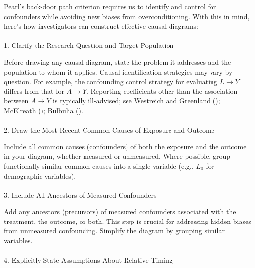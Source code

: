 \documentclass[
  singlecolumn]{article}
\makeatletter
\let\oldparagraph\paragraph
\renewcommand{\paragraph}{
    \@ifstar
      \xxxParagraphStar
      \xxxParagraphNoStar
  }
\newcommand{\xxxParagraphStar}[1]{\oldparagraph*{#1}\mbox{}}
\newcommand{\xxxParagraphNoStar}[1]{\oldparagraph{#1}\mbox{}}
\makeatother
\begin{document}
Pearl's back-door path criterion requires us to identify and control for
confounders while avoiding new biases from overconditioning. With this
in mind, here's how investigators can construct effective causal
diagrams:

\paragraph{1. Clarify the Research Question and Target
Population}\label{clarify-the-research-question-and-target-population}

Before drawing any causal diagram, state the problem it addresses and
the population to whom it applies. Causal identification strategies may
vary by question. For example, the confounding control strategy for
evaluating \(L \to Y\) differs from that for \(A \to Y\). Reporting
coefficients other than the association between \(A \to Y\) is typically
ill-advised; see Westreich and Greenland
(); McElreath
(); Bulbulia
().

\paragraph{2. Draw the Most Recent Common Causes of Exposure and
Outcome}\label{draw-the-most-recent-common-causes-of-exposure-and-outcome}

Include all common causes (confounders) of both the exposure and the
outcome in your diagram, whether measured or unmeasured. Where possible,
group functionally similar common causes into a single variable (e.g.,
\(L_0\) for demographic variables).

\paragraph{3. Include All Ancestors of Measured
Confounders}\label{include-all-ancestors-of-measured-confounders}

Add any ancestors (precursors) of measured confounders associated with
the treatment, the outcome, or both. This step is crucial for addressing
hidden biases from unmeasured confounding. Simplify the diagram by
grouping similar variables.

\paragraph{4. Explicitly State Assumptions About Relative
Timing}\label{explicitly-state-assumptions-about-relative-timing}
\end{document}
